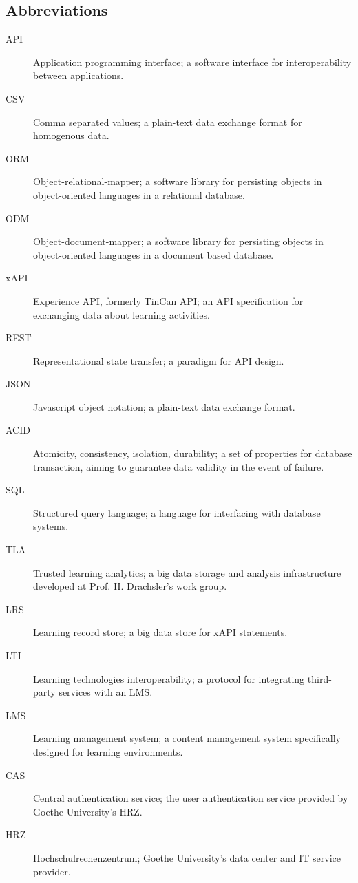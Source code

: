 \subsection{Abbreviations}
    \begin{description}
        \item[API] Application programming interface; a software interface for
        interoperability between applications.
        \item[CSV] Comma separated values; a plain-text data exchange format for homogenous
        data.
        \item[ORM] Object-relational-mapper; a software library for persisting objects
        in object-oriented languages in a relational database.
        \item[ODM] Object-document-mapper; a software library for persisting objects
        in object-oriented languages in a document based database.
        \item[xAPI] Experience API, formerly TinCan API; an API specification for
        exchanging data about learning activities.
        \item[REST] Representational state transfer; a paradigm for API design.
        \item[JSON] Javascript object notation; a plain-text data exchange format.
        \item[ACID] Atomicity, consistency, isolation, durability; a set of properties
        for database transaction, aiming to guarantee data validity in the event of failure.
        \item[SQL] Structured query language; a language for interfacing with database systems.
        \item[TLA] Trusted learning analytics; a big data storage and analysis infrastructure
        developed at Prof. H. Drachsler's work group.
        \item[LRS] Learning record store; a big data store for xAPI statements.
        \item[LTI] Learning technologies interoperability; a protocol for integrating third-party
        services with an LMS.
        \item[LMS] Learning management system; a content management system specifically
        designed for learning environments.
        \item[CAS] Central authentication service; the user authentication service provided
        by Goethe University's HRZ.
        \item[HRZ] Hochschulrechenzentrum; Goethe University's data center and IT service provider.
    \end{description}